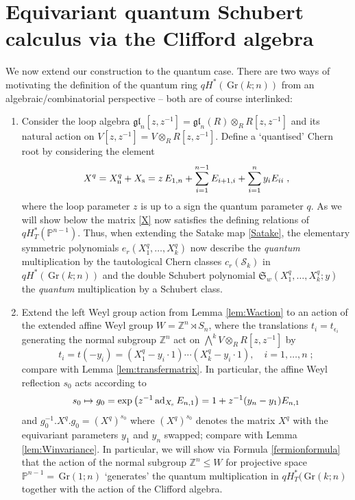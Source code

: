 \documentclass[12pt]{amsart}
\newcommand{\Z}{\mathbb{Z}}
\newcommand{\cS}{\mathcal{S}}
\newcommand{\Gr}{\,\mathrm{Gr}}
\newcommand{\fS}{\mathfrak{S}}
\newcommand{\mb}[1]{\mathbb{#1}}
\newcommand{\op}[1]{\operatorname{#1}}
\newcommand{\ring}{R}
\numberwithin{equation}{section}
\numberwithin{figure}{section}
\newcommand{\gl}{\mathfrak{gl}}
\begin{document}
\section{Equivariant quantum Schubert calculus via the Clifford algebra}
We now extend our construction to the quantum case. There are two ways of motivating the definition of the quantum ring $qH^*(\Gr(k;n))$ from an algebraic/combinatorial perspective -- both are of course interlinked:
\begin{enumerate}
    \item Consider the loop algebra $\gl_n[z,z^{-1}]=\gl_n(\ring)\otimes_\ring\ring[z,z^{-1}]$ and its natural action on $V[z,z^{-1}]=V\otimes_\ring\ring[z,z^{-1}]$. Define a `quantised' Chern root by considering the element
    \begin{equation}\label{X}
    X^q=X^q_{\rm n}+X_{\rm s}=z\,E_{1,n}+\sum_{i=1}^{n-1}E_{i+1,i}+\sum_{i=1}^ny_iE_{ii}\;,
    \end{equation}
    where the loop parameter $z$ is up to a sign the quantum parameter $q$. As we will show below the matrix \eqref{X} now satisfies the defining relations of $qH^*_T(\mb{P}^{n-1})$. Thus, when extending the Satake map \eqref{Satake}, the elementary symmetric polynomials $e_r(X^q_1,\ldots,X^q_k)$ now describe the {\em quantum} multiplication by the tautological Chern classes $c_r(\cS_k)$ in $qH^*(\Gr(k;n))$ and the double Schubert polynomial $\fS_w(X_1^q,\ldots,X_k^q;y)$ the {\em quantum} multiplication by a Schubert class.
    \item Extend the left Weyl group action from Lemma \ref{lem:Waction} to an action of the extended affine Weyl group $W=\Z^n\rtimes S_n$, where the translations $t_i=t_{\epsilon_i}$ generating the normal subgroup $\Z^n$ act on $\bigwedge^kV\otimes_\ring\ring[z,z^{-1}]$ by
    \[
    t_i=t(-y_i)=(X^q_1-y_i\cdot 1)\cdots (X_k^q-y_i\cdot 1),\quad i=1,\ldots,n\;;
    \]
    compare with Lemma \ref{lem:transfermatrix}. In particular, the affine Weyl reflection $s_0$ acts according to
    \begin{equation}\label{s0}
    s_0\mapsto g_0=\exp\left(z^{-1}\op{ad}_{X_{\rm s}}E_{n,1}\right)
    =1+z^{-1}(y_n-y_1)E_{n,1}
    \end{equation}
    and $g^{-1}_0.X^q.g_0=(X^q)^{s_0}$ where $(X^q)^{s_0}$ denotes the matrix $X^q$ with the equivariant parameters $y_1$ and $y_n$ swapped; compare with Lemma \ref{lem:Winvariance}. In particular, we will show via Formula \eqref{fermionformula} that the action of the normal subgroup $\Z^n\le W$ for projective space $\mb{P}^{n-1}=\Gr(1;n)$ `generates' the quantum multiplication in $qH^*_T(\Gr(k;n)$ together with the action of the Clifford algebra.
\end{enumerate}
\end{document}
